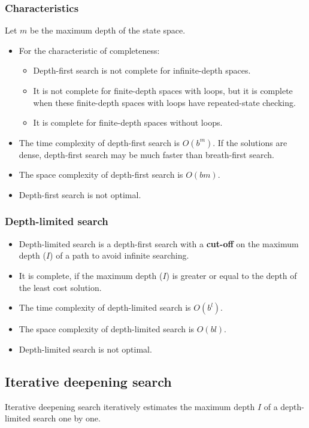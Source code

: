 \documentclass[11pt]{article}
\begin{document}
\subsubsection{Characteristics}
\label{sec:orgb49b0a5}
Let \(m\) be the maximum depth of the state space.
\begin{itemize}
\item For the characteristic of completeness:
\begin{itemize}
\item Depth-first search is not complete for infinite-depth spaces.
\item It is not complete for finite-depth spaces with loops, but it is complete when these finite-depth spaces with loops have repeated-state checking.
\item It is complete for finite-depth spaces without loops.
\end{itemize}
\item The time complexity of depth-first search is \(O(b^m)\). If the solutions are dense, depth-first search may be much faster than breath-first search.
\item The space complexity of depth-first search is \(O(bm)\).
\item Depth-first search is not optimal.
\end{itemize}

 \newpage
\subsubsection{Depth-limited search}
\label{sec:org2c394df}
\begin{itemize}
\item Depth-limited search is a depth-first search with a \textbf{cut-off} on the maximum depth (\(I\)) of a path to avoid infinite searching.
\item It is complete, if the maximum depth (\(I\)) is greater or equal to the depth of the least cost solution.
\item The time complexity of depth-limited search is \(O(b^l)\).
\item The space complexity of depth-limited search is \(O(bl)\).
\item Depth-limited search is not optimal.
\end{itemize}

 \newpage
\subsection{Iterative deepening search}
\label{sec:orgb6d62f3}
Iterative deepening search iteratively estimates the maximum depth \(I\) of a depth-limited search one by one.
\end{document}
